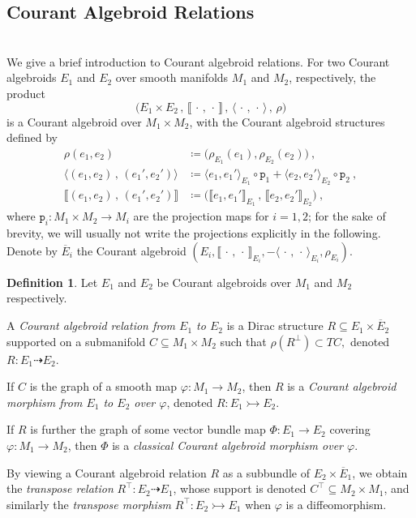 \documentclass[a4paper, reqno, 11pt]{amsart}
\numberwithin{equation}{section}
\theoremstyle{definition}
\newtheorem{definition}[equation]{Definition}
\newcommand{\ip}[1]{\langle #1 \rangle}
\newcommand{\rmp}{\mathtt{p}}
\theoremstyle{remark}
\begin{document}
\medskip

\subsection{Courant Algebroid Relations}\label{ssec:CArelations}~\\[5pt]
We give a brief introduction to Courant algebroid relations.
For two Courant algebroids $E_1$ and $E_2$ over smooth manifolds $M_1$ and $M_2$, respectively, the product $$\big(E_1\times E_2\,,\,\llbracket\,\cdot\,,\,\cdot\,\rrbracket \,,\,\langle\,\cdot\,,\,\cdot\,\rangle\,,\,\rho\big)$$ is a Courant algebroid over $M_1\times M_2$, with the Courant algebroid structures defined by
\begin{align}
    \rho(e_1, e_2) & \coloneqq \big(\rho_{E_1}(e_1), \rho_{E_2}(e_2)\big) \ , \\[4pt] \ip{(e_1, e_2)\,,\, (e_1', e_2')} & \coloneqq \ip{e_1, e_1'}_{E_1} \circ \rmp_1 + \ip{e_2, e_2'}_{E_2} \circ \rmp_2 \ , \label{eqn:pairingprod} \\[4pt]
    \llbracket(e_1,e_2)\,,\,(e_1',e_2')\rrbracket &\coloneqq \big(\llbracket e_1,e_1'\rrbracket_{E_1}\,,\,\llbracket e_2, e_2'\rrbracket_{E_2}\big) \ ,
\end{align}
where $\rmp_i\colon M_1\times M_2 \to M_i$ are the projection maps for $i=1,2$; for the sake of brevity, we will usually not write the projections explicitly in the following.
Denote by $\overline{E}_i$ the Courant algebroid $(E_i,\llbracket\,\cdot\,,\,\cdot\,\rrbracket_{E_i} ,-\langle\,\cdot\,,\,\cdot\,\rangle_{E_i},\rho_{E_i})$.

\begin{definition}
Let $E_1$ and $E_2$ be Courant algebroids over $M_1$ and $M_2$ respectively.

A \emph{Courant algebroid relation from $E_1$ to $E_2$} is a Dirac structure $R \subseteq E_1 \times \overline{E}_2$ supported on a submanifold $C\subseteq M_1 \times M_2$ such that $\rho(R^\perp) \subset TC,$ denoted $R\colon  E_1 \dashrightarrow E_2.$

If $C$ is the graph of a smooth map $\varphi \colon M_1 \to M_2$, then $R$ is a \emph{Courant algebroid morphism from $E_1$ to $E_2$ over $\varphi$}, denoted $R\colon E_1 \rightarrowtail E_2$.

If $R$ is further the graph of some vector bundle map $\Phi \colon E_1 \to E_2$ covering $\varphi\colon M_1 \to M_2$, then $\Phi$ is a \emph{classical Courant algebroid morphism over $\varphi$}.

By viewing a Courant algebroid relation $R$ as a subbundle of $E_2 \times \overline{E}_1$, we obtain the \emph{transpose relation} $R^\top\colon E_2 \dashrightarrow E_1$, whose support is denoted $C^\top\subseteq M_2\times M_1$, and similarly the \emph{transpose morphism} $R^\top\colon E_2 \rightarrowtail E_1$ when $\varphi$ is a diffeomorphism. 
\end{definition}
\end{document}
